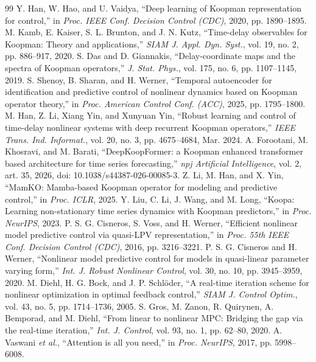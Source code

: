 \documentclass[journal]{IEEEtran}
\begin{document}
\begin{thebibliography}{99}
Y. Han, W. Hao, and U. Vaidya, ``Deep learning of Koopman representation for control,'' in \emph{Proc. IEEE Conf. Decision Control (CDC)}, 2020, pp. 1890--1895.
M. Kamb, E. Kaiser, S. L. Brunton, and J. N. Kutz, ``Time-delay observables for Koopman: Theory and applications,'' \emph{SIAM J. Appl. Dyn. Syst.}, vol. 19, no. 2, pp. 886--917, 2020.
S. Das and D. Giannakis, ``Delay-coordinate maps and the spectra of Koopman operators,'' \emph{J. Stat. Phys.}, vol. 175, no. 6, pp. 1107--1145, 2019.
S. Shenoy, B. Sharan, and H. Werner, ``Temporal autoencoder for identification and predictive control of nonlinear dynamics based on Koopman operator theory,'' in \emph{Proc. American Control Conf. (ACC)}, 2025, pp. 1795--1800.
M. Han, Z. Li, Xiang Yin, and Xunyuan Yin, ``Robust learning and control of time-delay nonlinear systems with deep recurrent Koopman operators,'' \emph{IEEE Trans. Ind. Informat.}, vol. 20, no. 3, pp. 4675--4684, Mar. 2024.
A. Forootani, M. Khosravi, and M. Barati, ``DeepKoopFormer: a Koopman enhanced transformer based architecture for time series forecasting,'' \emph{npj Artificial Intelligence}, vol. 2, art. 35, 2026, doi: 10.1038/s44387-026-00085-3.
Z. Li, M. Han, and X. Yin, ``MamKO: Mamba-based Koopman operator for modeling and predictive control,'' in \emph{Proc. ICLR}, 2025.
Y. Liu, C. Li, J. Wang, and M. Long, ``Koopa: Learning non-stationary time series dynamics with Koopman predictors,'' in \emph{Proc. NeurIPS}, 2023.
P. S. G. Cisneros, S. Voss, and H. Werner, ``Efficient nonlinear model predictive control via quasi-LPV representation,'' in \emph{Proc. 55th IEEE Conf. Decision Control (CDC)}, 2016, pp. 3216--3221.
P. S. G. Cisneros and H. Werner, ``Nonlinear model predictive control for models in quasi-linear parameter varying form,'' \emph{Int. J. Robust Nonlinear Control}, vol. 30, no. 10, pp. 3945--3959, 2020.
M. Diehl, H. G. Bock, and J. P. Schl\"oder, ``A real-time iteration scheme for nonlinear optimization in optimal feedback control,'' \emph{SIAM J. Control Optim.}, vol. 43, no. 5, pp. 1714--1736, 2005.
S. Gros, M. Zanon, R. Quirynen, A. Bemporad, and M. Diehl, ``From linear to nonlinear MPC: Bridging the gap via the real-time iteration,'' \emph{Int. J. Control}, vol. 93, no. 1, pp. 62--80, 2020.
A. Vaswani \emph{et al.}, ``Attention is all you need,'' in \emph{Proc. NeurIPS}, 2017, pp. 5998--6008.
\end{thebibliography}
\end{document}
